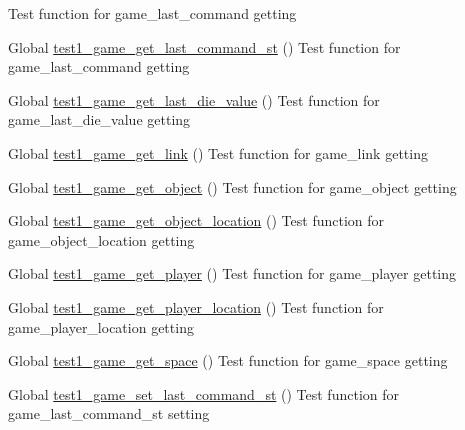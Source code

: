 \begin{DoxyRefList}
%
Test function for game\+\_\+last\+\_\+command getting  
\item[Global \mbox{\hyperlink{game__test_8c_a82025f723f207f0d08f54b50ea217ad3}{test1\+\_\+game\+\_\+get\+\_\+last\+\_\+command\+\_\+st}} ()]\label{test__test000050}%
%
Test function for game\+\_\+last\+\_\+command getting  
\item[Global \mbox{\hyperlink{game__test_8c_a4edd64e0a7bd98e68de55bf8d948ab62}{test1\+\_\+game\+\_\+get\+\_\+last\+\_\+die\+\_\+value}} ()]\label{test__test000046}%
%
Test function for game\+\_\+last\+\_\+die\+\_\+value getting  
\item[Global \mbox{\hyperlink{game__test_8c_ae0841f160573a442bf3eaae6f38efbb0}{test1\+\_\+game\+\_\+get\+\_\+link}} ()]\label{test__test000032}%
%
Test function for game\+\_\+link getting  
\item[Global \mbox{\hyperlink{game__test_8c_a8f95a6268c69b77fee78367936c6c7eb}{test1\+\_\+game\+\_\+get\+\_\+object}} ()]\label{test__test000029}%
%
Test function for game\+\_\+object getting  
\item[Global \mbox{\hyperlink{game__test_8c_aff63179aad895eeb2f2d5571156fd387}{test1\+\_\+game\+\_\+get\+\_\+object\+\_\+location}} ()]\label{test__test000043}%
%
Test function for game\+\_\+object\+\_\+location getting  
\item[Global \mbox{\hyperlink{game__test_8c_a867c32166bda065e0c64a4a7c8e7b6d8}{test1\+\_\+game\+\_\+get\+\_\+player}} ()]\label{test__test000035}%
%
Test function for game\+\_\+player getting  
\item[Global \mbox{\hyperlink{game__test_8c_aa387108e95dba4762d0f2cbfdbf30cd3}{test1\+\_\+game\+\_\+get\+\_\+player\+\_\+location}} ()]\label{test__test000042}%
%
Test function for game\+\_\+player\+\_\+location getting  
\item[Global \mbox{\hyperlink{game__test_8c_acc05e3dc9b82dbd4566c26a039646df9}{test1\+\_\+game\+\_\+get\+\_\+space}} ()]\label{test__test000026}%
%
Test function for game\+\_\+space getting  
\item[Global \mbox{\hyperlink{game__test_8c_aeb142fe8ccb3d612af59d176b8cff5f4}{test1\+\_\+game\+\_\+set\+\_\+last\+\_\+command\+\_\+st}} ()]\label{test__test000048}%
%
Test function for game\+\_\+last\+\_\+command\+\_\+st setting  

\end{DoxyRefList}
